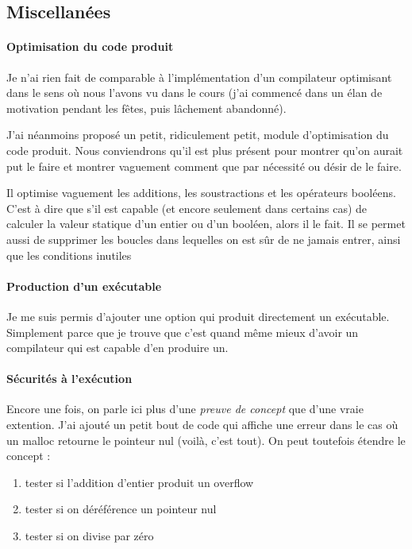 \documentclass[11pt]{article}
\begin{document}
\subsection{Miscellanées}

\paragraph{Optimisation du code produit}

Je n'ai rien fait de comparable à l'implémentation d'un compilateur optimisant dans le sens où nous l'avons vu dans le cours (j'ai commencé dans un élan de motivation pendant les fêtes, puis lâchement abandonné).

J'ai néanmoins proposé un petit, ridiculement petit, module d'optimisation du code produit. Nous conviendrons qu'il est plus présent pour montrer qu'on aurait put le faire et montrer vaguement comment que par nécessité ou désir de le faire.

Il optimise vaguement les additions, les soustractions et les opérateurs booléens. C'est à dire que s'il est capable (et encore seulement dans certains cas) de calculer la valeur statique d'un entier ou d'un booléen, alors il le fait. Il se permet aussi de supprimer les boucles dans lequelles on est sûr de ne jamais entrer, ainsi que les conditions inutiles

\paragraph{Production d'un exécutable}

Je me suis permis d'ajouter une option qui produit directement un exécutable. Simplement parce que je trouve que c'est quand même mieux d'avoir un compilateur qui est capable d'en produire un.

\paragraph{Sécurités à l'exécution}

Encore une fois, on parle ici plus d'une \textit{preuve de concept} que d'une vraie extention. J'ai ajouté un petit bout de code qui affiche une erreur dans le cas où un malloc retourne le pointeur nul (voilà, c'est tout). On peut toutefois étendre le concept :

\begin{enumerate}
\item tester si l'addition d'entier produit un overflow
\item tester si on déréférence un pointeur nul
\item tester si on divise par zéro
\end{enumerate}
\end{document}
